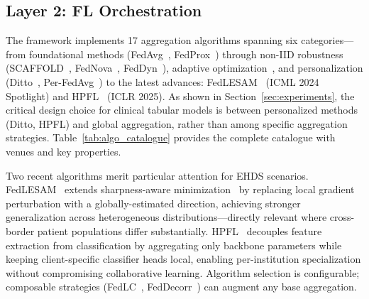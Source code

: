 \documentclass[conference,a4paper]{IEEEtran}
\begin{document}
\subsection{Layer 2: FL Orchestration}

The framework implements 17 aggregation algorithms spanning six categories---from foundational methods (FedAvg~\cite{mcmahan2017communication}, FedProx~\cite{li2020federated}) through non-IID robustness (SCAFFOLD~\cite{karimireddy2020scaffold}, FedNova~\cite{wang2020tackling}, FedDyn~\cite{acar2021feddyn}), adaptive optimization~\cite{reddi2021adaptive}, and personalization (Ditto~\cite{li2021ditto}, Per-FedAvg~\cite{fallah2020personalized}) to the latest advances: FedLESAM~\cite{qu2024fedlesam} (ICML 2024 Spotlight) and HPFL~\cite{chen2025hpfl} (ICLR 2025). As shown in Section~\ref{sec:experiments}, the critical design choice for clinical tabular models is between personalized methods (Ditto, HPFL) and global aggregation, rather than among specific aggregation strategies. Table~\ref{tab:algo_catalogue} provides the complete catalogue with venues and key properties.

Two recent algorithms merit particular attention for EHDS scenarios. FedLESAM~\cite{qu2024fedlesam} extends sharpness-aware minimization~\cite{qu2022fedsam} by replacing local gradient perturbation with a globally-estimated direction, achieving stronger generalization across heterogeneous distributions---directly relevant where cross-border patient populations differ substantially. HPFL~\cite{chen2025hpfl} decouples feature extraction from classification by aggregating only backbone parameters while keeping client-specific classifier heads local, enabling per-institution specialization without compromising collaborative learning. Algorithm selection is configurable; composable strategies (FedLC~\cite{zhang2022fedlc}, FedDecorr~\cite{shi2023feddecorr}) can augment any base aggregation.
\end{document}
